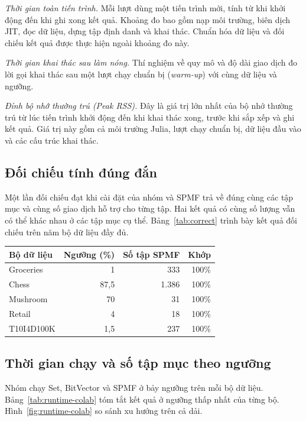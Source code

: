 \textit{Thời gian toàn tiến trình.} Mỗi lượt dùng một tiến trình
mới, tính từ khi khởi động đến khi ghi xong kết quả. Khoảng đo bao
gồm nạp môi trường, biên dịch JIT, đọc dữ liệu, dựng tập định danh
và khai thác. Chuẩn hóa dữ liệu và đối chiếu kết quả được thực hiện
ngoài khoảng đo này.

\textit{Thời gian khai thác sau làm nóng.} Thí nghiệm về quy mô và
độ dài giao dịch đo lời gọi khai thác sau một lượt chạy chuẩn bị
(\textit{warm-up}) với cùng dữ liệu và ngưỡng.

\textit{Đỉnh bộ nhớ thường trú (Peak RSS).} Đây là giá trị lớn nhất
của bộ nhớ thường trú từ lúc tiến trình khởi động đến khi khai thác
xong, trước khi sắp xếp và ghi kết quả. Giá trị này gồm cả môi trường
Julia, lượt chạy chuẩn bị, dữ liệu đầu vào và các cấu trúc khai thác.

\subsection{Đối chiếu tính đúng đắn}
Một lần đối chiếu đạt khi cài đặt của nhóm và SPMF trả về đúng cùng
các tập mục và cùng số giao dịch hỗ trợ cho từng tập. Hai kết quả
có cùng số lượng vẫn có thể khác nhau ở các tập mục cụ thể. Bảng~\ref{tab:correct}
trình bày kết quả đối chiếu trên năm bộ dữ liệu đầy đủ.

\begin{reporttable}
\caption{Kết quả đối chiếu từng tập mục và số hỗ trợ với SPMF.}
\label{tab:correct}
\footnotesize
\begin{tabular}{lrrr}\toprule
Bộ dữ liệu & Ngưỡng (\%) & Số tập SPMF & Khớp\\\midrule
Groceries & 1 & 333 & 100\%\\
Chess & 87,5 & 1.386 & 100\%\\
Mushroom & 70 & 31 & 100\%\\
Retail & 4 & 18 & 100\%\\
T10I4D100K & 1,5 & 237 & 100\%\\\bottomrule
\end{tabular}
\end{reporttable}

\subsection{Thời gian chạy và số tập mục theo ngưỡng}
Nhóm chạy Set, BitVector và SPMF ở bảy ngưỡng trên mỗi bộ dữ liệu.
Bảng~\ref{tab:runtime-colab} tóm tắt kết quả ở ngưỡng thấp nhất
của từng bộ. Hình~\ref{fig:runtime-colab} so sánh xu hướng trên cả dải.

